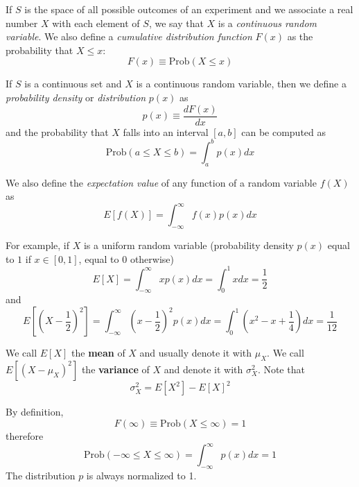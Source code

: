 \documentclass[justified,sixbynine]{tufte-book}
\theoremstyle{plain}%
\theoremstyle{definition}
\theoremstyle{remark}
\begin{document}
\begin{fullwidth}
If $S$ is the space of all possible outcomes of an experiment and we
associate a real number $X$ with each element of $S$, we say that $X$ is a {\it %
continuous random variable}. We also define a {\it cumulative distribution
function} $F(x)$ as the probability that $X\leq x$:
\begin{equation}
F(x)\equiv \textrm{Prob}(X\leq x)
\end{equation}

If $S$ is a continuous set and $X$ is a continuous random variable, then we
define a {\it probability density} or {\it distribution} $p(x)$ as
\begin{equation}
p(x)\equiv \frac{dF(x)}{dx}
\end{equation}
and the probability that $X$ falls into an interval $[a,b]$ can be computed
as
\begin{equation}
\textrm{Prob}(a\leq X\leq b)=\int_a^bp(x)dx
\end{equation}


We also define the {\it expectation value} of any function of a random
variable $f(X)$ as
\begin{equation}
E[f(X)]=\int_{-\infty }^\infty f(x)p(x)dx
\end{equation}

For example, if $X$ is a uniform random variable (probability density $p(x)$ equal to $1$ if
$x\in [0,1]$, equal to $0$ otherwise)
\begin{equation}
E[X]=\int_{-\infty }^\infty xp(x)dx=\int_0^1xdx=\frac 12
\end{equation}
and
\begin{equation}
E[(X-\frac 12)^2]=\int_{-\infty }^\infty (x-\frac
12)^2p(x)dx=\int_0^1(x^2-x+\frac 14)dx=\frac 1{12}
\end{equation}

We call $E[X]$ the {\bf mean} of $X$ and usually denote it with $\mu _X$.
We call $E[(X-\mu _X)^2]$ the {\bf variance} of $X$ and denote it with $%
\sigma _X^2$. Note that
\begin{equation}
\sigma _X^2=E[X^2]-E[X]^2
\end{equation}

By definition,
\begin{equation}
F(\infty )\equiv \textrm{Prob}(X\leq \infty )=1
\end{equation}
therefore
\begin{equation}
\textrm{Prob}(-\infty \leq X\leq \infty )=\int_{-\infty }^\infty p(x)dx=1
\end{equation}
The distribution $p$ is always normalized to 1.


\end{fullwidth}
\end{document}
